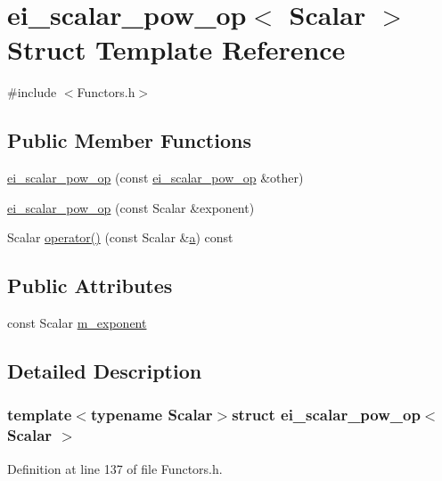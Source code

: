 \hypertarget{structei__scalar__pow__op}{\section{ei\-\_\-scalar\-\_\-pow\-\_\-op$<$ Scalar $>$ Struct Template Reference}
\label{structei__scalar__pow__op}
}


{\ttfamily \#include $<$Functors.\-h$>$}

\subsection*{Public Member Functions}
\begin{DoxyCompactItemize}
\item 
\hyperlink{structei__scalar__pow__op_a3c337920794d8eead16c18df9c191e88}{ei\-\_\-scalar\-\_\-pow\-\_\-op} (const \hyperlink{structei__scalar__pow__op}{ei\-\_\-scalar\-\_\-pow\-\_\-op} \&other)
\item 
\hyperlink{structei__scalar__pow__op_a31f5abeada1382c06449ebdc7abac1a6}{ei\-\_\-scalar\-\_\-pow\-\_\-op} (const Scalar \&exponent)
\item 
Scalar \hyperlink{structei__scalar__pow__op_a257dc7d16a1eb7eb0fb201049d518319}{operator()} (const Scalar \&\hyperlink{glext_8h_ac8729153468b5dcf13f971b21d84d4e5}{a}) const 
\end{DoxyCompactItemize}
\subsection*{Public Attributes}
\begin{DoxyCompactItemize}
\item 
const Scalar \hyperlink{structei__scalar__pow__op_ae2e65192a58f55b9a0ced4536b4be1d1}{m\-\_\-exponent}
\end{DoxyCompactItemize}


\subsection{Detailed Description}
\subsubsection*{template$<$typename Scalar$>$struct ei\-\_\-scalar\-\_\-pow\-\_\-op$<$ Scalar $>$}



Definition at line 137 of file Functors.\-h.



